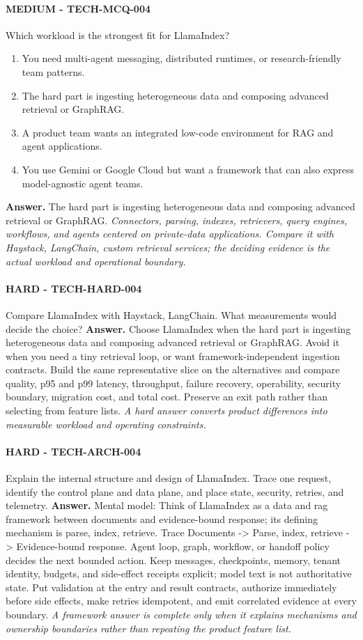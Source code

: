 \paragraph{MEDIUM - TECH-MCQ-004} Which workload is the strongest fit for LlamaIndex?
\begin{enumerate}[label=\Alph*.]
\item You need multi-agent messaging, distributed runtimes, or research-friendly team patterns.
\item The hard part is ingesting heterogeneous data and composing advanced retrieval or GraphRAG.
\item A product team wants an integrated low-code environment for RAG and agent applications.
\item You use Gemini or Google Cloud but want a framework that can also express model-agnostic agent teams.
\end{enumerate}
\textbf{Answer.} The hard part is ingesting heterogeneous data and composing advanced retrieval or GraphRAG.
\textit{Connectors, parsing, indexes, retrievers, query engines, workflows, and agents centered on private-data applications. Compare it with Haystack, LangChain, custom retrieval services; the deciding evidence is the actual workload and operational boundary.}
\paragraph{HARD - TECH-HARD-004} Compare LlamaIndex with Haystack, LangChain. What measurements would decide the choice?
\textbf{Answer.} Choose LlamaIndex when the hard part is ingesting heterogeneous data and composing advanced retrieval or GraphRAG. Avoid it when you need a tiny retrieval loop, or want framework-independent ingestion contracts. Build the same representative slice on the alternatives and compare quality, p95 and p99 latency, throughput, failure recovery, operability, security boundary, migration cost, and total cost. Preserve an exit path rather than selecting from feature lists.
\textit{A hard answer converts product differences into measurable workload and operating constraints.}
\paragraph{HARD - TECH-ARCH-004} Explain the internal structure and design of LlamaIndex. Trace one request, identify the control plane and data plane, and place state, security, retries, and telemetry.
\textbf{Answer.} Mental model: Think of LlamaIndex as a data and rag framework between documents and evidence-bound response; its defining mechanism is parse, index, retrieve. Trace Documents -> Parse, index, retrieve -> Evidence-bound response. Agent loop, graph, workflow, or handoff policy decides the next bounded action. Keep messages, checkpoints, memory, tenant identity, budgets, and side-effect receipts explicit; model text is not authoritative state. Put validation at the entry and result contracts, authorize immediately before side effects, make retries idempotent, and emit correlated evidence at every boundary.
\textit{A framework answer is complete only when it explains mechanisms and ownership boundaries rather than repeating the product feature list.}

